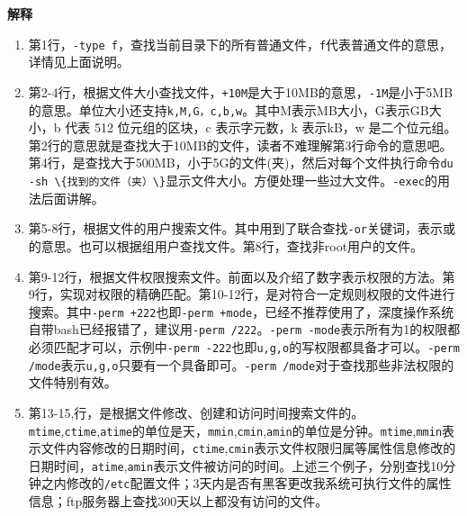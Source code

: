 \documentclass[doctor,openright,twoside]{sjtuthesis}
\providecommand{\tightlist}{%
    \setlength{\itemsep}{0pt}\setlength{\parskip}{0pt}}
\newcommand{\passthrough}[1]{#1}
\theoremstyle{plain}
\theoremstyle{definition}
\theoremstyle{remark}
\theoremstyle{ocrenumbox}
\theoremstyle{plain}
\begin{document}
\textbf{解释}

\begin{enumerate}
\def\labelenumi{\arabic{enumi}.}
\tightlist
\item
  第1行，\passthrough{\lstinline!-type f!}，查找当前目录下的所有普通文件，\passthrough{\lstinline!f!}代表普通文件的意思，详情见上面说明。
\item
  第2-4行，根据文件大小查找文件，\passthrough{\lstinline!+10M!}是大于10MB的意思，\passthrough{\lstinline!-1M!}是小于5MB的意思。单位大小还支持\passthrough{\lstinline!k,M,G，c,b,w!}。其中M表示MB大小，G表示GB大小，b 代表 512 位元组的区块，c 表示字元数，k 表示kB，w 是二个位元组。第2行的意思就是查找大于10MB的文件，读者不难理解第3行命令的意思吧。第4行，是查找大于500MB，小于5G的文件(夹)，然后对每个文件执行命令\passthrough{\lstinline!du -sh \{找到的文件（夹）\}!}显示文件大小。方便处理一些过大文件。\passthrough{\lstinline!-exec!}的用法后面讲解。
\item
  第5-8行，根据文件的用户搜索文件。其中用到了联合查找\passthrough{\lstinline!-or!}关键词，表示或的意思。也可以根据组用户查找文件。第8行，查找非root用户的文件。
\item
  第9-12行，根据文件权限搜索文件。前面以及介绍了数字表示权限的方法。第9行，实现对权限的精确匹配。第10-12行，是对符合一定规则权限的文件进行搜索。其中\passthrough{\lstinline!-perm +222!}也即\passthrough{\lstinline!-perm +mode!}，已经不推荐使用了，深度操作系统自带bash已经报错了，建议用\passthrough{\lstinline!-perm /222!}。\passthrough{\lstinline!-perm -mode!}表示所有为1的权限都必须匹配才可以，示例中\passthrough{\lstinline!-perm -222!}也即\passthrough{\lstinline!u,g,o!}的写权限都具备才可以。\passthrough{\lstinline!-perm /mode!}表示\passthrough{\lstinline!u,g,o!}只要有一个具备即可。\passthrough{\lstinline!-perm /mode!}对于查找那些非法权限的文件特别有效。
\item
  第13-15,行，是根据文件修改、创建和访问时间搜索文件的。\passthrough{\lstinline!mtime!},\passthrough{\lstinline!ctime!},\passthrough{\lstinline!atime!}的单位是天，\passthrough{\lstinline!mmin!},\passthrough{\lstinline!cmin!},\passthrough{\lstinline!amin!}的单位是分钟。\passthrough{\lstinline!mtime!},\passthrough{\lstinline!mmin!}表示文件内容修改的日期时间，\passthrough{\lstinline!ctime!},\passthrough{\lstinline!cmin!}表示文件权限归属等属性信息修改的日期时间，\passthrough{\lstinline!atime!},\passthrough{\lstinline!amin!}表示文件被访问的时间。上述三个例子，分别查找10分钟之内修改的\passthrough{\lstinline!/etc!}配置文件；3天内是否有黑客更改我系统可执行文件的属性信息；ftp服务器上查找300天以上都没有访问的文件。
\end{enumerate}
\end{document}
